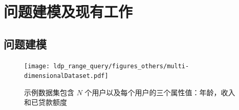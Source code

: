 





\section{问题建模及现有工作}
\subsection{问题建模}
\begin{figure}[h]
    \centering
    \texttt{[image: ldp\_range\_query/figures\_others/multi-dimensionalDataset.pdf]}
    \caption{示例数据集包含 $N$ 个用户以及每个用户的三个属性值：年龄，收入和已贷款额度} 
    \label{Example dataset}
\end{figure}

